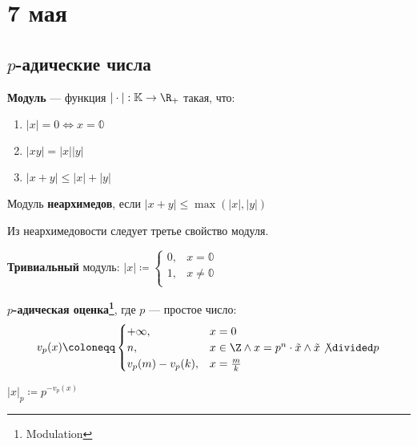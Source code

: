 \chapter{7 мая}

\section{\(p\)-адические числа}

\begin{definition}
	\textbf{Модуль} --- функция \(|\cdot| : \mathbb{K} \to \R_+\) такая, что:
	\begin{enumerate}
		\item \(|x| = 0 \iff x = \mathbb{0}\)
		\item \(|xy| = |x| |y|\)
		\item \(|x + y| \le |x| + |y|\)
	\end{enumerate}
\end{definition}

\begin{definition}
	Модуль \textbf{неархимедов}, если \(|x + y| \le \max(|x|, |y|)\)
\end{definition}
\begin{remark}
    Из неархимедовости следует третье свойство модуля.
\end{remark}

\begin{definition}
	\textbf{Тривиальный} модуль: \(|x| \coloneqq \begin{cases}
		0, & x = \mathbb{0}    \\
		1, & x \neq \mathbb{0} \\
	\end{cases}\)
\end{definition}

\begin{definition}
	\textbf{\(p\)-адическая оценка\footnote{Modulation}}, где \(p\) --- простое число:
	\[v_p(x) \coloneqq \begin{cases}
			+\infty,         & x = 0                                                                 \\
			n,               & x \in \Z \land x = p^n \cdot \tilde{x} \land \tilde{x} \not\divided p \\
			v_p(m) - v_p(k), & x = \frac{m}{k}
		\end{cases}\]
\end{definition}

\begin{definition}[\(p\)-модуль]
	\(|x|_p \coloneqq p^{-v_p(x)}\)
\end{definition}

